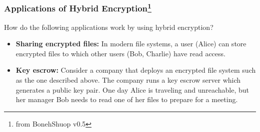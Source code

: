 \begin{frame}\frametitle{Applications of Hybrid Encryption\footnote{from BonehShuop v0.5}}
\begin{exampleblock}{How do the following applications work by using hybrid encryption?}
\begin{itemize}
\item \textbf{Sharing encrypted files:} In modern file systems, a user (Alice) can store encrypted files to which other users (Bob, Charlie) have read access. 
\item \textbf{Key escrow:} Consider a company that deploys an encrypted file system such as the one described above. The company runs a key escrow server which generates a public key pair. One day Alice is traveling and unreachable, but her manager Bob needs to read one of her files to prepare for a meeting. 
\end{itemize}
\end{exampleblock}
\end{frame}
